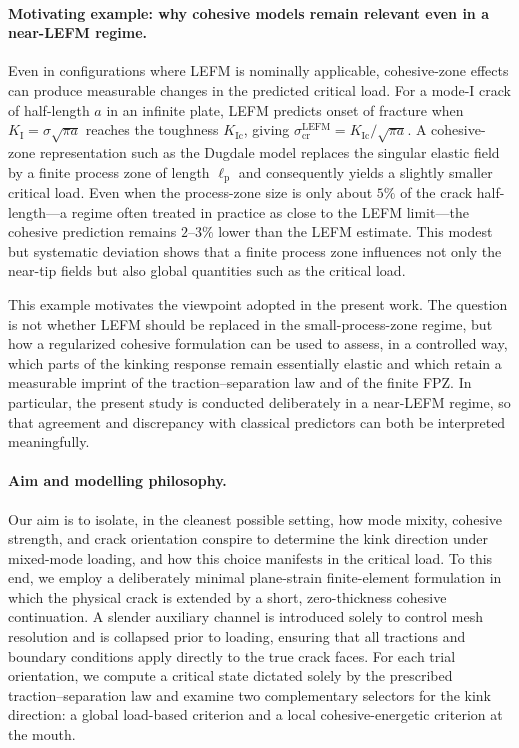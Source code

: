 \documentclass[smallextended]{svjour3}       %
\begin{document}
\paragraph{Motivating example: why cohesive models remain relevant even in a near-LEFM regime.}
Even in configurations where LEFM is nominally applicable, cohesive-zone
effects can produce measurable changes in the predicted critical load. For
a mode-I crack of half-length $a$ in an infinite plate, LEFM predicts
onset of fracture when $K_{\mathrm{I}}=\sigma\sqrt{\pi a}$ reaches the
toughness $K_{\mathrm{Ic}}$, giving
$\sigma_{\mathrm{cr}}^{\mathrm{LEFM}} = K_{\mathrm{Ic}}/\sqrt{\pi a}$.
A cohesive-zone representation such as the Dugdale model replaces the
singular elastic field by a finite process zone of length
$\ell_{\mathrm{p}}$ and consequently yields a slightly smaller critical
load. Even when the process-zone size is only about $5\%$ of the crack
half-length---a regime often treated in practice as close to the LEFM
limit---the cohesive prediction remains $2$--$3\%$ lower than the LEFM
estimate. This modest but systematic deviation shows that a finite process
zone influences not only the near-tip fields but also global quantities
such as the critical load.

This example motivates the viewpoint adopted in the present work. The
question is not whether LEFM should be replaced in the small-process-zone
regime, but how a regularized cohesive formulation can be used to assess,
in a controlled way, which parts of the kinking response remain essentially
elastic and which retain a measurable imprint of the traction--separation
law and of the finite FPZ. In particular, the present study is conducted
deliberately in a near-LEFM regime, so that agreement and discrepancy with
classical predictors can both be interpreted meaningfully.

\paragraph{Aim and modelling philosophy.}
Our aim is to isolate, in the cleanest possible setting, how mode mixity,
cohesive strength, and crack orientation conspire to determine the kink
direction under mixed-mode loading, and how this choice manifests in the
critical load. To this end, we employ a deliberately minimal plane-strain
finite-element formulation in which the physical crack is extended by a
short, zero-thickness cohesive continuation. A slender auxiliary channel
is introduced solely to control mesh resolution and is collapsed prior to
loading, ensuring that all tractions and boundary conditions apply
directly to the true crack faces. For each trial orientation, we compute a
critical state dictated solely by the prescribed traction--separation law
and examine two complementary selectors for the kink direction: a global
load-based criterion and a local cohesive-energetic criterion at the
mouth.
\end{document}
